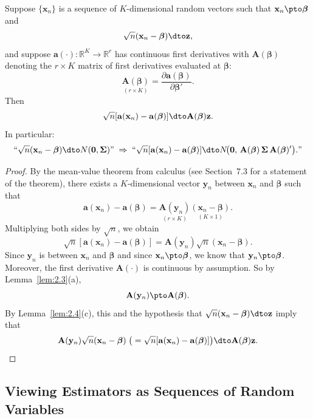 \begin{lemma}
\label{lem:2.5}
Suppose $\{\mathbf{x}_n\}$ is a sequence of $K$-dimensional random vectors such
that $\mathbf{x}_n \pto \bm{\beta}$ and
\[
  \sqrt{n}(\mathbf{x}_n - \bm{\beta}) \dto \mathbf{z},
\]
and suppose $\mathbf{a}(\cdot)\colon \mathbb{R}^K \to \mathbb{R}^r$ has continuous
first derivatives with $\mathbf{A}(\bm{\beta})$ denoting the $r \times K$ matrix of
first derivatives evaluated at $\bm{\beta}$:
\[
  \underset{(r \times K)}{\mathbf{A}(\bm{\beta})}
  = \frac{\partial \mathbf{a}(\bm{\beta})}{\partial \bm{\beta}'}.
\]
Then
\[
  \sqrt{n}[\mathbf{a}(\mathbf{x}_n) - \mathbf{a}(\bm{\beta})]
  \dto \mathbf{A}(\bm{\beta})\mathbf{z}.
\]
In particular:
\[
  \text{``}\sqrt{n}(\mathbf{x}_n - \bm{\beta}) \dto N(\mathbf{0}, \bm{\Sigma})\text{''}
  \;\Rightarrow\;
  \text{``}\sqrt{n}[\mathbf{a}(\mathbf{x}_n) - \mathbf{a}(\bm{\beta})]
  \dto N\!\big(\mathbf{0},\,
  \mathbf{A}(\bm{\beta})\,\bm{\Sigma}\,\mathbf{A}(\bm{\beta})'\big).\text{''}
\]
\end{lemma}

\begin{proof}
By the mean-value theorem from calculus (see Section~7.3 for a statement of the
theorem), there exists a $K$-dimensional vector $\mathbf{y}_n$ between
$\mathbf{x}_n$ and $\bm{\beta}$ such that
\[
  \mathbf{a}(\mathbf{x}_n) - \mathbf{a}(\bm{\beta})
  = \underset{(r \times K)}{\mathbf{A}(\mathbf{y}_n)}
    \underset{(K \times 1)}{(\mathbf{x}_n - \bm{\beta})}.
\]
Multiplying both sides by $\sqrt{n}$, we obtain
\[
  \sqrt{n}[\mathbf{a}(\mathbf{x}_n) - \mathbf{a}(\bm{\beta})]
  = \mathbf{A}(\mathbf{y}_n)\sqrt{n}(\mathbf{x}_n - \bm{\beta}).
\]
Since $\mathbf{y}_n$ is between $\mathbf{x}_n$ and $\bm{\beta}$ and since
$\mathbf{x}_n \pto \bm{\beta}$, we know that $\mathbf{y}_n \pto \bm{\beta}$.
Moreover, the first derivative $\mathbf{A}(\cdot)$ is continuous by assumption.
So by Lemma~\ref{lem:2.3}(a),
\[
  \mathbf{A}(\mathbf{y}_n) \pto \mathbf{A}(\bm{\beta}).
\]
By Lemma~\ref{lem:2.4}(c), this and the hypothesis that
$\sqrt{n}(\mathbf{x}_n - \bm{\beta}) \dto \mathbf{z}$ imply that
\[
  \mathbf{A}(\mathbf{y}_n)\sqrt{n}(\mathbf{x}_n - \bm{\beta})
  \;\big(= \sqrt{n}[\mathbf{a}(\mathbf{x}_n) - \mathbf{a}(\bm{\beta})]\big)
  \dto \mathbf{A}(\bm{\beta})\mathbf{z}. \qedhere
\]
\end{proof}

\subsection*{Viewing Estimators as Sequences of Random Variables}


